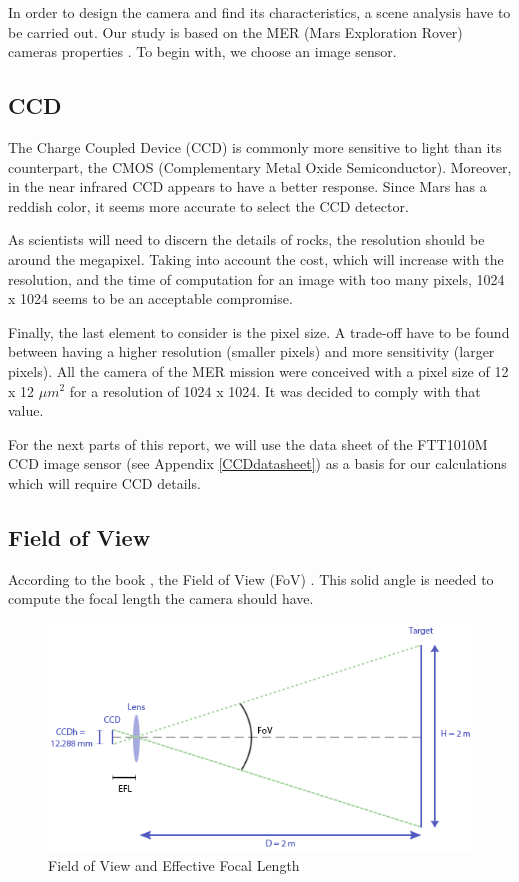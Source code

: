 In order to design the camera and find its characteristics, a scene analysis have to be carried out. Our study is based on the MER (Mars Exploration Rover) cameras properties \cite{merengineeringcameras}.
To begin with, we choose an image sensor. 

\subsection{CCD}
\label{fig:CCD}
The Charge Coupled Device (CCD) is commonly more sensitive to light than its counterpart, the CMOS (Complementary Metal Oxide Semiconductor). Moreover, in the near infrared CCD appears to have a better response. Since Mars has a reddish color, it seems more accurate to select the CCD detector.

As scientists will need to discern the details of rocks, the resolution should be around the megapixel. Taking into account the cost, which will increase with the resolution, and the time of computation for an image with too many pixels, 1024 x 1024 seems to be an acceptable compromise.

Finally, the last element to consider is the pixel size. A trade-off have to be found between having a higher resolution (smaller pixels) and more sensitivity (larger pixels). All the camera of the MER mission were conceived with a pixel size of 12 x 12 $\mu m^2$ for a resolution of 1024 x 1024. It was decided to comply with that value.

For the next parts of this report, we will use the data sheet of the FTT1010M CCD image sensor (see Appendix \ref{CCDdatasheet}) as a basis for our calculations which will require CCD details.

\subsection{Field of View}
According to the book \cite{book}, the Field of View (FoV) . This solid angle is needed to compute the focal length the camera should have.

\begin{figure}[h]
  \centering
  \includegraphics[scale=0.7]{fig/FOV.png}
  \caption{Field of View and Effective Focal Length}
  \label{fig:FOV}
\end{figure}

